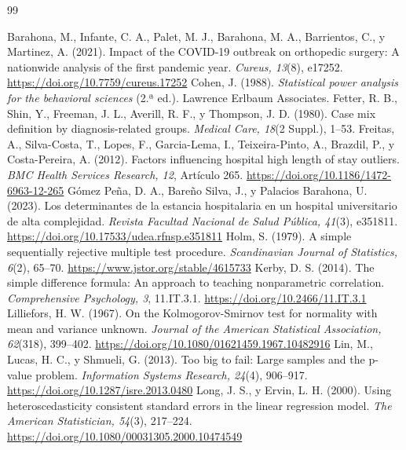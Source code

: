 \documentclass[10.5pt,a4paper,headings=small,abstract=false,bibliography=totoc,listof=totoc]{scrartcl}
\begin{document}
\clearpage
\begin{thebibliography}{99}\small\raggedright\setlength{\itemsep}{0.25em}
 Barahona, M., Infante, C. A., Palet, M. J., Barahona, M. A., Barrientos, C., y Martinez, A. (2021). Impact of the COVID-19 outbreak on orthopedic surgery: A nationwide analysis of the first pandemic year. \emph{Cureus, 13}(8), e17252. \url{https://doi.org/10.7759/cureus.17252}
 Cohen, J. (1988). \emph{Statistical power analysis for the behavioral sciences} (2.ª ed.). Lawrence Erlbaum Associates.
 Fetter, R. B., Shin, Y., Freeman, J. L., Averill, R. F., y Thompson, J. D. (1980). Case mix definition by diagnosis-related groups. \emph{Medical Care, 18}(2 Suppl.), 1--53.
 Freitas, A., Silva-Costa, T., Lopes, F., Garcia-Lema, I., Teixeira-Pinto, A., Brazdil, P., y Costa-Pereira, A. (2012). Factors influencing hospital high length of stay outliers. \emph{BMC Health Services Research, 12}, Artículo 265. \url{https://doi.org/10.1186/1472-6963-12-265}
 Gómez Peña, D. A., Bareño Silva, J., y Palacios Barahona, U. (2023). Los determinantes de la estancia hospitalaria en un hospital universitario de alta complejidad. \emph{Revista Facultad Nacional de Salud Pública, 41}(3), e351811. \url{https://doi.org/10.17533/udea.rfnsp.e351811}
 Holm, S. (1979). A simple sequentially rejective multiple test procedure. \emph{Scandinavian Journal of Statistics, 6}(2), 65--70. \url{https://www.jstor.org/stable/4615733}
 Kerby, D. S. (2014). The simple difference formula: An approach to teaching nonparametric correlation. \emph{Comprehensive Psychology, 3}, 11.IT.3.1. \url{https://doi.org/10.2466/11.IT.3.1}
 Lilliefors, H. W. (1967). On the Kolmogorov-Smirnov test for normality with mean and variance unknown. \emph{Journal of the American Statistical Association, 62}(318), 399--402. \url{https://doi.org/10.1080/01621459.1967.10482916}
 Lin, M., Lucas, H. C., y Shmueli, G. (2013). Too big to fail: Large samples and the p-value problem. \emph{Information Systems Research, 24}(4), 906--917. \url{https://doi.org/10.1287/isre.2013.0480}
 Long, J. S., y Ervin, L. H. (2000). Using heteroscedasticity consistent standard errors in the linear regression model. \emph{The American Statistician, 54}(3), 217--224. \url{https://doi.org/10.1080/00031305.2000.10474549}

\end{thebibliography}
\end{document}
